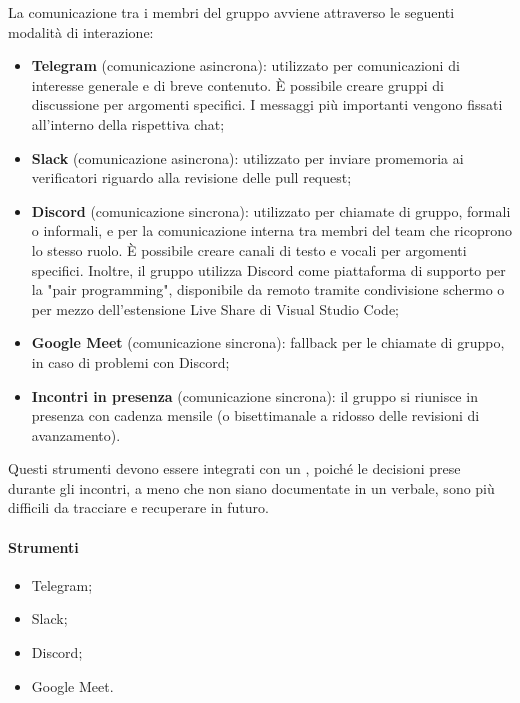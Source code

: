 \par La comunicazione tra i membri del gruppo avviene attraverso le seguenti modalità di interazione:
\begin{itemize}
  \item \textbf{Telegram} (comunicazione asincrona): utilizzato per comunicazioni di interesse generale e di breve contenuto. È possibile creare gruppi di discussione per argomenti specifici. I messaggi più importanti vengono fissati all'interno della rispettiva chat;
  \item \textbf{Slack} (comunicazione asincrona): utilizzato per inviare promemoria ai verificatori riguardo alla revisione delle pull request;
  \item \textbf{Discord} (comunicazione sincrona): utilizzato per chiamate di gruppo, formali o informali, e per la comunicazione interna tra membri del team che ricoprono lo stesso ruolo. È possibile creare canali di testo e vocali per argomenti specifici. Inoltre, il gruppo utilizza Discord come piattaforma di supporto per la "pair programming", disponibile da remoto tramite condivisione schermo o per mezzo dell'estensione Live Share di Visual Studio Code;
  \item \textbf{Google Meet} (comunicazione sincrona): fallback per le chiamate di gruppo, in caso di problemi con Discord;
  \item \textbf{Incontri in presenza} (comunicazione sincrona): il gruppo si riunisce in presenza con cadenza mensile (o bisettimanale a ridosso delle revisioni di avanzamento).
\end{itemize}

\vspace{0.5\baselineskip}
\par Questi strumenti devono essere integrati con un , poiché le decisioni prese durante gli incontri, a meno che non siano documentate in un verbale, sono più difficili da tracciare e recuperare in futuro.

\paragraph*{Strumenti}
\IntroStrumenti
\begin{itemize}
  \item Telegram;
  \item Slack;
  \item Discord;
  \item Google Meet.
\end{itemize}

